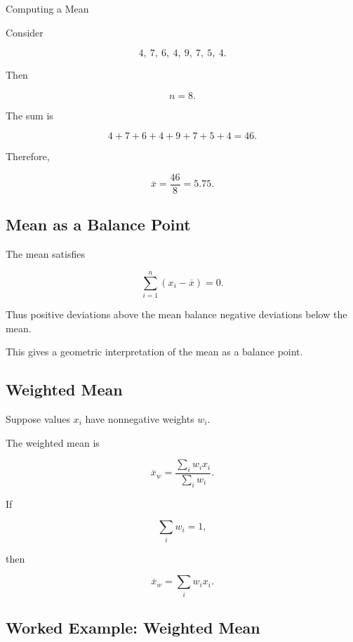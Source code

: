 \begin{workedexamplebox}{Computing a Mean}

Consider

\[
4,\ 7,\ 6,\ 4,\ 9,\ 7,\ 5,\ 4.
\]

Then

\[
n=8.
\]

The sum is

\[
4+7+6+4+9+7+5+4=46.
\]

Therefore,

\begin{answerbox}
\[
\boxed{
\overline{x}
=
\frac{46}{8}
=
5.75.
}
\]
\end{answerbox}

\end{workedexamplebox}

\subsection{Mean as a Balance Point}
\label{subsec:mean-balance-point}

The mean satisfies

\[
\boxed{
\sum_{i=1}^{n}
(x_i-\overline{x})
=
0.
}
\]

Thus positive deviations above the mean balance negative deviations below
the mean.

This gives a geometric interpretation of the mean as a balance point.

\subsection{Weighted Mean}
\label{subsec:weighted-mean}

Suppose values \(x_i\) have nonnegative weights \(w_i\).

The weighted mean is

\[
\boxed{
\overline{x}_w
=
\frac{
\sum_iw_ix_i
}{
\sum_iw_i
}.
}
\]

If

\[
\sum_iw_i=1,
\]

then

\[
\boxed{
\overline{x}_w
=
\sum_iw_ix_i.
}
\]

\subsection{Worked Example: Weighted Mean}
\label{subsec:worked-weighted-mean}

